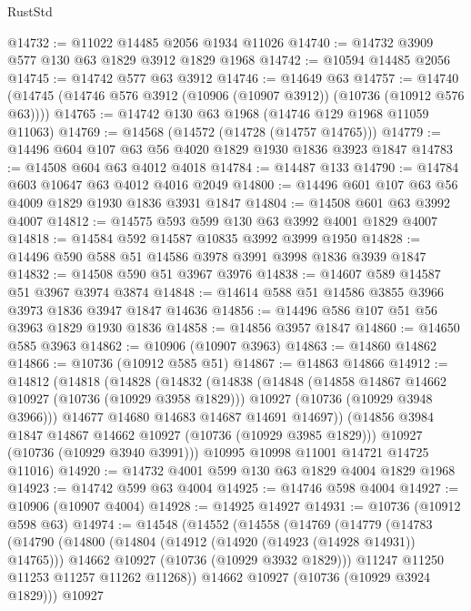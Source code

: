 \begin{lexlean}{RustStd}
\begin{coremodule}
@14732 := @11022 @14485 @2056 @1934 @11026
@14740 := @14732 @3909 @577 @130 @63 @1829 @3912 @1829 @1968
@14742 := @10594 @14485 @2056
@14745 := @14742 @577 @63 @3912
@14746 := @14649 @63
@14757 := @14740 (@14745 (@14746 @576 @3912 (@10906 (@10907 @3912)) (@10736 (@10912 @576 @63))))
@14765 := @14742 @130 @63 @1968 (@14746 @129 @1968 @11059 @11063)
@14769 := @14568 (@14572 (@14728 (@14757 @14765)))
@14779 := @14496 @604 @107 @63 @56 @4020 @1829 @1930 @1836 @3923 @1847
@14783 := @14508 @604 @63 @4012 @4018
@14784 := @14487 @133
@14790 := @14784 @603 @10647 @63 @4012 @4016 @2049
@14800 := @14496 @601 @107 @63 @56 @4009 @1829 @1930 @1836 @3931 @1847
@14804 := @14508 @601 @63 @3992 @4007
@14812 := @14575 @593 @599 @130 @63 @3992 @4001 @1829 @4007
@14818 := @14584 @592 @14587 @10835 @3992 @3999 @1950
@14828 := @14496 @590 @588 @51 @14586 @3978 @3991 @3998 @1836 @3939 @1847
@14832 := @14508 @590 @51 @3967 @3976
@14838 := @14607 @589 @14587 @51 @3967 @3974 @3874
@14848 := @14614 @588 @51 @14586 @3855 @3966 @3973 @1836 @3947 @1847 @14636
@14856 := @14496 @586 @107 @51 @56 @3963 @1829 @1930 @1836
@14858 := @14856 @3957 @1847
@14860 := @14650 @585 @3963
@14862 := @10906 (@10907 @3963)
@14863 := @14860 @14862
@14866 := @10736 (@10912 @585 @51)
@14867 := @14863 @14866
@14912 := @14812
    (@14818
      (@14828
        (@14832
          (@14838
            (@14848
              (@14858 @14867 @14662 @10927 (@10736 (@10929 @3958 @1829)))
              @10927
              (@10736 (@10929 @3948 @3966)))
            @14677
            @14680
            @14683
            @14687
            @14691
            @14697))
        (@14856 @3984 @1847 @14867 @14662 @10927 (@10736 (@10929 @3985 @1829)))
        @10927
        (@10736 (@10929 @3940 @3991)))
      @10995
      @10998
      @11001
      @14721
      @14725
      @11016)
@14920 := @14732 @4001 @599 @130 @63 @1829 @4004 @1829 @1968
@14923 := @14742 @599 @63 @4004
@14925 := @14746 @598 @4004
@14927 := @10906 (@10907 @4004)
@14928 := @14925 @14927
@14931 := @10736 (@10912 @598 @63)
@14974 := @14548
    (@14552
      (@14558
        (@14769
          (@14779
            (@14783
              (@14790
                (@14800
                  (@14804 (@14912 (@14920 (@14923 (@14928 @14931)) @14765)))
                  @14662
                  @10927
                  (@10736 (@10929 @3932 @1829)))
                @11247
                @11250
                @11253
                @11257
                @11262
                @11268))
            @14662
            @10927
            (@10736 (@10929 @3924 @1829)))
          @10927

\end{coremodule}
\end{lexlean}
